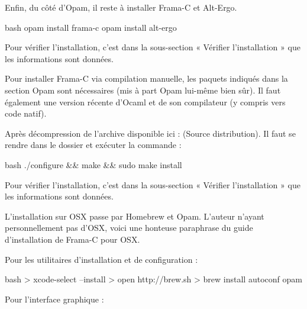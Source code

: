Enfin, du côté d'Opam, il reste à installer Frama-C et Alt-Ergo.



\begin{CodeBlock}{bash}
opam install frama-c
opam install alt-ergo
\end{CodeBlock}



Pour vérifier l'installation, c'est dans la sous-section « Vérifier l'installation »
que les informations sont données.





Pour installer Frama-C via compilation manuelle, les paquets indiqués dans la 
section Opam sont nécessaires (mis à part Opam lui-même bien sûr). Il faut
également une version récente d'Ocaml et de son compilateur (y compris vers 
code natif).



Après décompression de l'archive disponible ici : 
 (Source distribution). 
Il faut se rendre dans le dossier et exécuter la commande :



\begin{CodeBlock}{bash}
./configure && make && sudo make install
\end{CodeBlock}



Pour vérifier l'installation, c'est dans la sous-section « Vérifier l'installation »
que les informations sont données.





L'installation sur OSX passe par Homebrew et Opam. L'auteur n'ayant
personnellement pas d'OSX, voici une honteuse paraphrase du guide 
d'installation de Frama-C pour OSX.



Pour les utilitaires d'installation et de configuration :



\begin{CodeBlock}{bash}
> xcode-select --install 
> open http://brew.sh
> brew install autoconf opam 
\end{CodeBlock}



Pour l'interface graphique :



